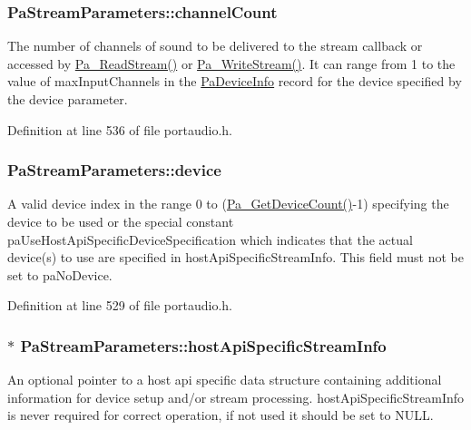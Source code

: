 \subsubsection[{\texorpdfstring{channel\+Count}{channelCount}}]{ Pa\+Stream\+Parameters\+::channel\+Count}\hypertarget{struct_pa_stream_parameters_a861ff361da71fc2572dd356c9c9878ca}{}\label{struct_pa_stream_parameters_a861ff361da71fc2572dd356c9c9878ca}
The number of channels of sound to be delivered to the stream callback or accessed by \hyperlink{portaudio_8h_a0b62d4b74b5d3d88368e9e4c0b8b2dc7}{Pa\+\_\+\+Read\+Stream()} or \hyperlink{portaudio_8h_a075a6efb503a728213bdae24347ed27d}{Pa\+\_\+\+Write\+Stream()}. It can range from 1 to the value of max\+Input\+Channels in the \hyperlink{struct_pa_device_info}{Pa\+Device\+Info} record for the device specified by the device parameter. 

Definition at line 536 of file portaudio.\+h.

\subsubsection[{\texorpdfstring{device}{device}}]{ Pa\+Stream\+Parameters\+::device}\hypertarget{struct_pa_stream_parameters_aebaf648b4d11dd1252a747b76b8da084}{}\label{struct_pa_stream_parameters_aebaf648b4d11dd1252a747b76b8da084}
A valid device index in the range 0 to (\hyperlink{portaudio_8h_acfe4d3c5ec1a343f459981bfa2057f8d}{Pa\+\_\+\+Get\+Device\+Count()}-\/1) specifying the device to be used or the special constant pa\+Use\+Host\+Api\+Specific\+Device\+Specification which indicates that the actual device(s) to use are specified in host\+Api\+Specific\+Stream\+Info. This field must not be set to pa\+No\+Device. 

Definition at line 529 of file portaudio.\+h.

\subsubsection[{\texorpdfstring{host\+Api\+Specific\+Stream\+Info}{hostApiSpecificStreamInfo}}]{$\ast$ Pa\+Stream\+Parameters\+::host\+Api\+Specific\+Stream\+Info}\hypertarget{struct_pa_stream_parameters_aff01b9fa0710ad1654471e97665c06a9}{}\label{struct_pa_stream_parameters_aff01b9fa0710ad1654471e97665c06a9}
An optional pointer to a host api specific data structure containing additional information for device setup and/or stream processing. host\+Api\+Specific\+Stream\+Info is never required for correct operation, if not used it should be set to N\+U\+LL. 

